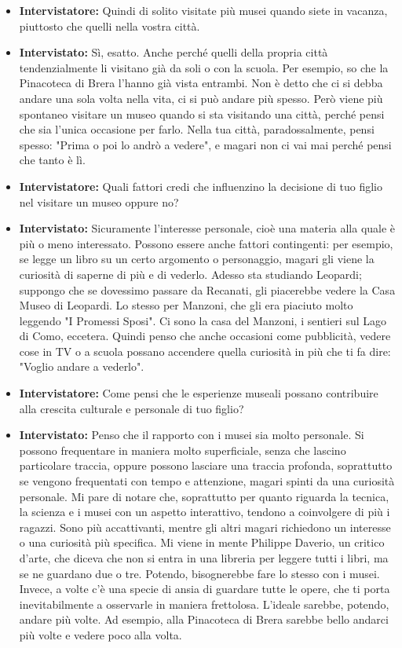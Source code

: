 \documentclass{article}
\begin{document}
\begin{itemize}
    \item \textbf{Intervistatore:} Quindi di solito visitate più musei quando siete in vacanza, piuttosto che quelli nella vostra città.
    \item \textbf{Intervistato:} Sì, esatto. Anche perché quelli della propria città tendenzialmente li visitano già da soli o con la scuola. Per esempio, so che la Pinacoteca di Brera l'hanno già vista entrambi. Non è detto che ci si debba andare una sola volta nella vita, ci si può andare più spesso. Però viene più spontaneo visitare un museo quando si sta visitando una città, perché pensi che sia l'unica occasione per farlo. Nella tua città, paradossalmente, pensi spesso: "Prima o poi lo andrò a vedere", e magari non ci vai mai perché pensi che tanto è lì.
    \item \textbf{Intervistatore:} Quali fattori credi che influenzino la decisione di tuo figlio nel visitare un museo oppure no?
    \item \textbf{Intervistato:} Sicuramente l'interesse personale, cioè una materia alla quale è più o meno interessato. Possono essere anche fattori contingenti: per esempio, se legge un libro su un certo argomento o personaggio, magari gli viene la curiosità di saperne di più e di vederlo. Adesso sta studiando Leopardi; suppongo che se dovessimo passare da Recanati, gli piacerebbe vedere la Casa Museo di Leopardi. Lo stesso per Manzoni, che gli era piaciuto molto leggendo "I Promessi Sposi". Ci sono la casa del Manzoni, i sentieri sul Lago di Como, eccetera. Quindi penso che anche occasioni come pubblicità, vedere cose in TV o a scuola possano accendere quella curiosità in più che ti fa dire: "Voglio andare a vederlo".
    \item \textbf{Intervistatore:} Come pensi che le esperienze museali possano contribuire alla crescita culturale e personale di tuo figlio?
    \item \textbf{Intervistato:} Penso che il rapporto con i musei sia molto personale. Si possono frequentare in maniera molto superficiale, senza che lascino particolare traccia, oppure possono lasciare una traccia profonda, soprattutto se vengono frequentati con tempo e attenzione, magari spinti da una curiosità personale. Mi pare di notare che, soprattutto per quanto riguarda la tecnica, la scienza e i musei con un aspetto interattivo, tendono a coinvolgere di più i ragazzi. Sono più accattivanti, mentre gli altri magari richiedono un interesse o una curiosità più specifica.
    Mi viene in mente Philippe Daverio, un critico d'arte, che diceva che non si entra in una libreria per leggere tutti i libri, ma se ne guardano due o tre. Potendo, bisognerebbe fare lo stesso con i musei. Invece, a volte c'è una specie di ansia di guardare tutte le opere, che ti porta inevitabilmente a osservarle in maniera frettolosa. L'ideale sarebbe, potendo, andare più volte. Ad esempio, alla Pinacoteca di Brera sarebbe bello andarci più volte e vedere poco alla volta.

\end{itemize}
\end{document}

